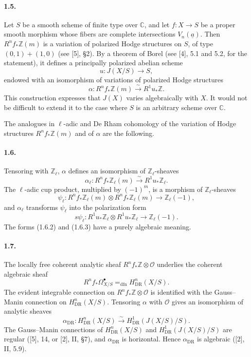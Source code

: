 \documentclass[10pt]{article}
\newcommand{\C}{\mathbb C}
\newcommand{\Z}{\mathbb Z}
\newcommand{\DR}{\mathrm{DR}}
\newcommand{\iso}{\xrightarrow{\sim}}
\begin{document}
\paragraph{1.5.} Let \(S\) be a smooth scheme of finite type over \(\C\), and let \(f:X\to S\) be a proper smooth morphism whose fibers are complete intersections \(V_n(\underline a)\). Then \(R^nf_*\Z(m)\) is a variation of polarized Hodge structures on \(S\), of type \((0,1)+(1,0)\) (see [5], §2). By a theorem of Borel (see [4], 5.1 and 5.2, for the statement), it defines a principally polarized abelian scheme
\[
u:J(X/S)\longrightarrow S,
\]
endowed with an isomorphism of variations of polarized Hodge structures
\[
\alpha:R^nf_*\Z(m)\iso R^1u_*\Z.
\]
This construction expresses that \(J(X)\) varies algebraically with \(X\). It would not be difficult to extend it to the case where \(S\) is an arbitrary scheme over \(\C\).

The analogues in \(\ell\)-adic and De Rham cohomology of the variation of Hodge structures \(R^nf_*\Z(m)\) and of \(\alpha\) are the following.

\paragraph{1.6.} Tensoring with \(\Z_\ell\), \(\alpha\) defines an isomorphism of \(\Z_\ell\)-sheaves
\[
\tag{1.6.1}
\alpha_\ell:R^nf_*\Z_\ell(m)\iso R^1u_*\Z_\ell.
\]
The \(\ell\)-adic cup product, multiplied by \((-1)^m\), is a morphism of \(\Z_\ell\)-sheaves
\[
\tag{1.6.2}
\psi_\ell:R^nf_*\Z_\ell(m)\otimes R^nf_*\Z_\ell(m)\longrightarrow\Z_\ell(-1),
\]
and \(\alpha_\ell\) transforms \(\psi_\ell\) into the polarization form
\[
\tag{1.6.3}
s\psi_\ell:R^1u_*\Z_\ell\otimes R^1u_*\Z_\ell\longrightarrow\Z_\ell(-1).
\]
The forms (1.6.2) and (1.6.3) have a purely algebraic meaning.

\paragraph{1.7.} The locally free coherent analytic sheaf \(R^nf_*\Z\otimes\mathcal O\) underlies the coherent algebraic sheaf
\[
R^nf_*\Omega^\bullet_{X/S}=_{\mathrm{dfn}}H^n_{\DR}(X/S).
\]
The evident integrable connection on \(R^nf_*\Z\otimes\mathcal O\) is identified with the Gauss--Manin connection on \(H^n_{\DR}(X/S)\). Tensoring \(\alpha\) with \(\mathcal O\) gives an isomorphism of analytic sheaves
\[
\tag{1.7.1}
\alpha_{\DR}:H^n_{\DR}(X/S)\iso H^1_{\DR}(J(X/S)/S).
\]
The Gauss--Manin connections of \(H^n_{\DR}(X/S)\) and \(H^1_{\DR}(J(X/S)/S)\) are regular ([5], 14, or [2], II, §7), and \(\alpha_{\DR}\) is horizontal. Hence \(\alpha_{\DR}\) is algebraic ([2], II, 5.9).
\end{document}
